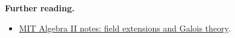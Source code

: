 \documentclass[preprint,12pt,aps,pra,showkeys,amsmath,amssymb,superscriptaddress,floatfix]{revtex4-2}
\theoremstyle{definition}
\theoremstyle{remark}
\providecommand{\tightlist}{\setlength{\itemsep}{2pt}\setlength{\parskip}{0pt}}
\begin{document}
\par\smallskip\begingroup\small\linespread{1.0}\selectfont\noindent\textbf{Further reading.} \begin{itemize}
\tightlist
\item
  \href{https://ocw.mit.edu/courses/res-18-012-algebra-ii-student-notes-spring-2022/pages/student-notes/}{MIT
  Algebra II notes: field extensions and Galois theory}.
\end{itemize}\par\endgroup
\end{document}
